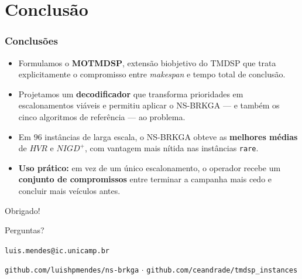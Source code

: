 \documentclass[
	11pt,
	aspectratio=169, %
]{beamer}
\newcommand{\NIGDplus}{\mathit{NIGD^{+}}}
\newcommand{\HVR}{\mathit{HVR}}
\newcommand{\alg}[1]{#1}
\begin{document}
\section{Conclusão}

\begin{frame}
\frametitle{Conclus\~oes}

\begin{itemize}\setlength{\itemsep}{10pt}
\item Formulamos o \textbf{MOTMDSP}, extens\~ao biobjetivo do TMDSP que trata
      explicitamente o compromisso entre \emph{makespan} e tempo total de
      conclus\~ao.

\item Projetamos um \textbf{decodificador} que transforma prioridades em
      escalonamentos vi\'aveis e permitiu aplicar o \alg{NS-BRKGA} ---
      e tamb\'em os cinco algoritmos de refer\^encia --- ao problema.

\item Em $96$ inst\^ancias de larga escala, o \alg{NS-BRKGA} obteve as
      \textbf{melhores m\'edias} de $\HVR$ e $\NIGDplus$, com vantagem mais
      n\'itida nas inst\^ancias \texttt{rare}.

\item \textbf{Uso pr\'atico:} em vez de um \'unico escalonamento, o operador
      recebe um \textbf{conjunto de compromissos} entre terminar a campanha
      mais cedo e concluir mais ve\'iculos antes.
\end{itemize}

\end{frame}

\begin{frame}[plain]
\begin{center}
{\Huge Obrigado!}

\bigskip

{\LARGE Perguntas?}

\bigskip\bigskip

\texttt{luis.mendes@ic.unicamp.br}

\medskip

{\small\color{black!60}
\texttt{github.com/luishpmendes/ns-brkga} \quad$\cdot$\quad
\texttt{github.com/ceandrade/tmdsp\_instances}}
\end{center}
\end{frame}
\end{document}
